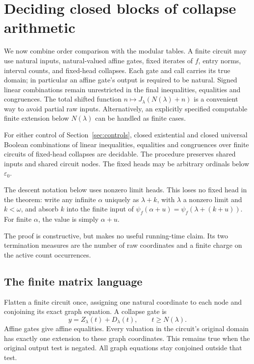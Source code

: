 \section{Deciding closed blocks of collapse arithmetic}\label{sec:arithmetic}

We now combine order comparison with the modular tables. A finite circuit
may use natural inputs, natural-valued affine gates, fixed iterates of
\(f\), entry norms, interval counts, and fixed-head collapses. Each gate
and call carries its true domain; in particular an affine gate's output
is required to be natural. Signed linear combinations remain unrestricted
in the final inequalities, equalities and congruences. The total shifted function
\(n\mapsto J_\lambda(N(\lambda)+n)\) is a convenient way to avoid
partial raw inputs. Alternatively, an explicitly specified computable
finite extension below \(N(\lambda)\) can be handled as finite cases.

\begin{theorem}\label{thm:arithmetic}
For either control of Section~\ref{sec:controls}, closed existential
and closed universal Boolean combinations of linear inequalities,
equalities and congruences over finite circuits of fixed-head collapses
are decidable. The procedure preserves shared inputs and shared circuit
nodes. The fixed heads may be arbitrary ordinals below \(\varepsilon_0\).
\end{theorem}

The descent notation below uses nonzero limit heads. This loses no fixed
head in the theorem: write any infinite \(\alpha\) uniquely as
\(\lambda+k\), with \(\lambda\) a nonzero limit and \(k<\omega\),
and absorb \(k\) into the finite input of
\(\psi_f(\alpha+u)=\psi_f(\lambda+(k+u))\).
For finite \(\alpha\), the value is simply \(\alpha+u\).

The proof is constructive, but makes no useful running-time claim. Its
two termination measures are the number of raw coordinates and a finite
charge on the active count occurrences.

\subsection{The finite matrix language}

Flatten a finite circuit once, assigning one natural coordinate to each
node and conjoining its exact graph equation. A collapse gate is
\[
 y=Z_\lambda(t)+D_\lambda(t),\qquad t\ge N(\lambda).
\]
Affine gates give affine equalities. Every valuation in the circuit's
original domain has exactly one extension to these graph coordinates.
This remains true when the
original output test is negated. All graph equations stay conjoined
outside that test.

